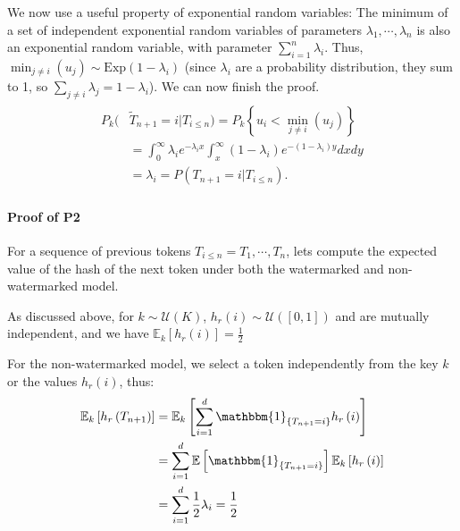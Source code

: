 We now use a useful property of exponential random variables: The minimum of a set of independent exponential random variables of parameters $\lambda_1, \cdots, \lambda_n$ is also an exponential random variable, with parameter $\sum_{i=1}^n \lambda_i$. Thus, $\min_{j \neq i}(u_j) \sim \mathrm{Exp}(1-\lambda_i)$ (since $\lambda_i$ are a probability distribution, they sum to 1, so $\sum_{j\neq i}\lambda_j = 1 - \lambda_i$). We can now finish the proof.
\begin{align}
    \begin{split}
        P_k(&\widetilde{T}_{n+1} = i | T_{i\leq n})
        = P_k\left\{ u_i < \min_{j \neq i}(u_j) \right\} \\
        &= \int_0^{\infty} \lambda_i e^{-\lambda_i x} \int_x^{\infty} (1-\lambda_i) e^{-(1-\lambda_i) y} dx dy\\
        &= \lambda_i = P(T_{n+1} = i | T_{i\leq n}).
    \end{split}
\end{align}

\paragraph{Proof of \textbf{P2}}

For a sequence of previous tokens $T_{i\leq n} = T_1,\cdots,T_n$, lets compute the expected value of the hash of the next token under both the watermarked and non-watermarked model.

As discussed above, for $k \sim \mathcal{U}(K)$, $h_r(i) \sim \mathcal{U}([0,1])$ and are mutually independent, and we have $\mathbb{E}_k\left[ h_r(i) \right] = \frac{1}{2}$

For the non-watermarked model, we select a token independently from the key $k$ or the values $h_r(i)$, thus:
\begin{align}
    \begin{split}
        \mathbb{E}_k\left[ h_r\left(T_{n+1}\right) \right]
        &= \mathbb{E}_k\left[ \sum_{i=1}^d \mathbbm{1}_{\{T_{n+1} = i\}} h_r\left(i\right) \right]\\
        &= \sum_{i=1}^d \mathbb{E}\left[ \mathbbm{1}_{\{T_{n+1} = i\}} \right]  \mathbb{E}_k\left[ h_r\left(i\right) \right]\\
        &= \sum_{i=1}^d \frac{1}{2}\lambda_i = \frac{1}{2}
    \end{split}
\end{align}

